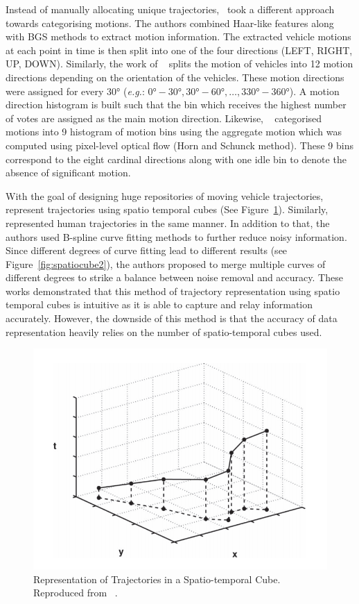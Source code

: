 Instead of manually allocating unique trajectories,~
took a different approach towards categorising motions. The authors combined
Haar-like features along with BGS methods to extract motion information. The
extracted vehicle motions at each point in time is then split into one of the
four directions (LEFT, RIGHT, UP, DOWN). Similarly, the work of
~ splits the motion of vehicles into 12 motion directions
depending on the orientation of the vehicles. These motion directions were
assigned for every $\ang{30}$ (\emph{e.g.}: $\ang{0}-\ang{30}, \ang{30}-\ang{60}, \ldots,
\ang{330}-\ang{360}$). A motion direction histogram is built such that the bin
which receives the highest number of votes are assigned as the main motion direction. Likewise, ~ categorised motions into 9 histogram of motion bins using the aggregate motion which was computed using pixel-level optical flow (Horn and Schunck method). These 9 bins correspond to the eight cardinal directions along with one idle bin to denote the absence of significant motion.

With the goal of designing huge repositories of moving vehicle trajectories,~ represent trajectories using spatio temporal cubes (See
Figure~\ref{fig:spatiocube}). Similarly,~ represented human trajectories in the same manner. In addition to that, the authors used B-spline curve fitting methods to further reduce noisy information. Since different degrees of curve fitting lead to different results (see Figure~\ref{fig:spatiocube2}), the authors proposed to merge multiple curves of different degrees to strike a balance between noise removal and accuracy. These works demonstrated that this method of trajectory representation using spatio temporal cubes is intuitive as it is able to capture and relay information accurately. However, the downside of this method is that the accuracy of data representation heavily relies on the
number of spatio-temporal cubes used.

\begin{figure}[hbt!]
  \centering
  \includegraphics[width=.5\textwidth]{image/lit/spatiotemporal.PNG}
  \caption[Representation of Trajectories in a Spatio-temporal Cube]
 {Representation of Trajectories in a Spatio-temporal Cube. Reproduced from
 ~.}
  \label{fig:spatiocube}
\end{figure}

